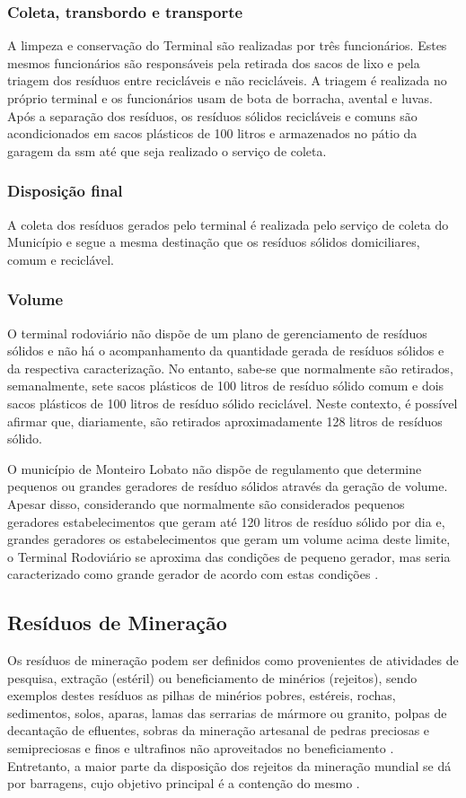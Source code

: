 	
	\subsubsection{Coleta, transbordo e transporte}
	A limpeza e conservação do Terminal são realizadas por três funcionários. Estes mesmos funcionários são responsáveis pela retirada dos sacos de lixo e pela triagem dos resíduos entre recicláveis e não recicláveis. A triagem é realizada no próprio terminal e os funcionários usam de bota de borracha, avental e luvas. Após a separação dos resíduos, os resíduos sólidos recicláveis e comuns são acondicionados em sacos plásticos de 100 litros e armazenados no pátio da garagem da \gls{ssm} até que seja realizado o serviço de coleta.
	
	\subsubsection{Disposição final}
	A coleta dos resíduos gerados pelo terminal é realizada pelo serviço de coleta do Município e segue a mesma destinação que os resíduos sólidos domiciliares, comum e reciclável. 
	
	\subsubsection{Volume}
	O terminal rodoviário não dispõe de um plano de gerenciamento de resíduos sólidos e não há o acompanhamento da quantidade gerada de resíduos sólidos e da respectiva caracterização. No entanto, sabe-se que normalmente são retirados, semanalmente, sete sacos plásticos de 100 litros de resíduo sólido comum e dois sacos plásticos de 100 litros de resíduo sólido reciclável. Neste contexto, é possível afirmar que, diariamente, são retirados aproximadamente 128 litros de resíduos sólido.

	O município de Monteiro Lobato não dispõe de regulamento que determine pequenos ou grandes geradores de resíduo sólidos através da geração de volume. Apesar disso, considerando que normalmente são considerados pequenos geradores estabelecimentos que geram até 120 litros de resíduo sólido por dia e, grandes geradores os estabelecimentos que geram um volume acima deste limite, o Terminal Rodoviário se aproxima das condições de pequeno gerador, mas seria caracterizado como grande gerador de acordo com estas condições \cite{ibam:2001}.
	
	
	\subsection{Resíduos de Mineração}
	Os resíduos de mineração podem ser definidos como provenientes de atividades de pesquisa, extração (estéril) ou beneficiamento de minérios (rejeitos), sendo exemplos destes resíduos as pilhas de minérios pobres, estéreis, rochas, sedimentos, solos, aparas, lamas das serrarias de mármore ou granito, polpas de decantação de efluentes, sobras da mineração artesanal de pedras preciosas e semipreciosas e finos e ultrafinos não aproveitados no beneficiamento \cite{IBRAM2016}. Entretanto, a maior parte da disposição dos rejeitos da mineração mundial se dá por barragens, cujo objetivo principal é a contenção do mesmo \cite{MME:2017, IBRAM2016}.
	
